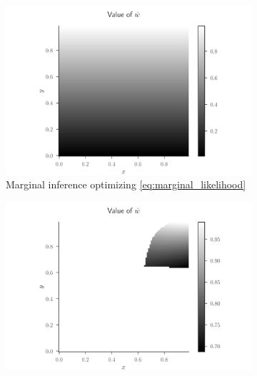 \documentclass{article}
\begin{document}
\begin{figure}
\centering
\begin{subfigure}{.45\linewidth}
\centering
\includegraphics[width=\textwidth]{w-hat-empirical-001-marginal}
\caption[short]{Marginal inference optimizing \eqref{eq:marginal_likelihood}}
\end{subfigure}
\begin{subfigure}{.45\linewidth}
\centering
\includegraphics[width=\textwidth]{w-hat-empirical-001}

\end{subfigure}
\end{figure}
\end{document}
